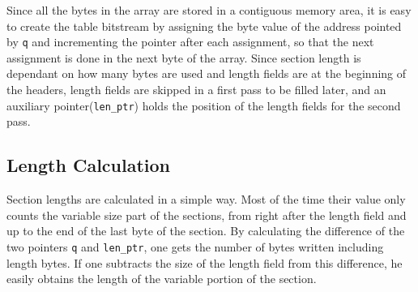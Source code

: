\documentclass[
	12pt,				%
	openright,			%
	twoside,			%
	a4paper,			%
	brazil,
	french,				%
	english
	]{abntex2}
\begin{document}
Since all the bytes in the array are stored in a contiguous memory area, it is easy to create the table bitstream by assigning the byte value of the address pointed by \texttt{q} and incrementing the pointer after each assignment, so that the next assignment is done in the next byte of the array. Since section length is dependant on how many bytes are used and length fields are at the beginning of the headers, length fields are skipped in a first pass to be filled later, and an auxiliary pointer(\texttt{len\hspace{0.1mm}\_\hspace{0.1mm}ptr}) holds the position of the length fields for the second pass. 

\subsection{Length Calculation}
\label{length_calc}

Section lengths are calculated in a simple way. Most of the time their value only counts the variable size part of the sections, from right after the length field and up to the end of the last byte of the section. By calculating the difference of the two pointers \texttt{q} and \texttt{len\hspace{0.1mm}\_\hspace{0.1mm}ptr}, one gets the number of bytes written including length bytes. If one subtracts the size of the length field from this difference, he easily obtains the length of the variable portion of the section.
\end{document}

